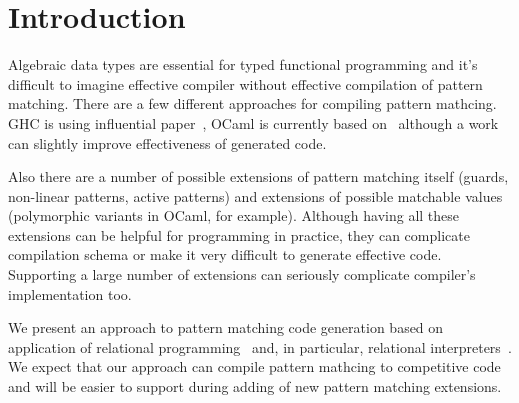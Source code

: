 \section{Introduction}

Algebraic data types are essential for typed functional programming and it's difficult to imagine effective compiler without effective compilation of pattern matching. 
There are a few different approaches for compiling pattern mathcing. GHC is using influential paper~\cite{Jones1987}, OCaml is currently based on~\cite{maranget2001} although a work~\cite{maranget2008} can slightly improve effectiveness of generated code. 

Also there are a number of possible extensions of pattern matching itself (guards, non-linear patterns, active patterns) and extensions of possible matchable values (polymorphic variants in OCaml, for example). Although having all these extensions can be helpful for programming in practice, they can complicate compilation schema or make it very difficult to generate effective code. Supporting a large number  of extensions can seriously complicate compiler's implementation too.

We present an approach to pattern matching code generation based on application of relational programming~\cite{TRS,WillThesis} and, in
 particular, relational interpreters~\cite{unified}. We expect that our approach can compile pattern mathcing to competitive code and will be easier to support during adding of new pattern matching extensions.
 
